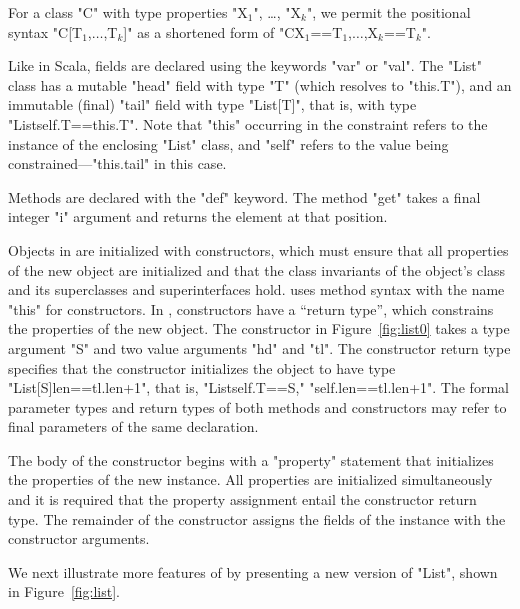 For a class
\xcd"C"
with type properties
\xcdmath"X$_1$",
\dots,
\xcdmath"X$_k$",
we permit the positional syntax
\xcdmath"C[T$_1$,$\dots$,T$_k$]"
as a shortened form of
\xcdmath"C{X$_1$==T$_1$,$\dots$,X$_k$==T$_k$}".

Like in Scala, fields are declared using the keywords \xcd"var"
or \xcd"val".  The \xcd"List" class has a mutable \xcd"head"
field with type \xcd"T" (which resolves to \xcd"this.T"), and an
immutable (final) \xcd"tail" field with type \xcd"List[T]", that
is, with type \xcd"List{self.T==this.T}".  Note that \xcd"this" occurring
in the constraint refers to the instance of the enclosing
\xcd"List" class,
and \xcd"self" refers to the value being
constrained---\xcd"this.tail" in this case.

Methods are declared with the \xcd"def" keyword.
The method \xcd"get" takes a final integer \xcd"i" argument
and returns the element at that position.

Objects in \Xten{} are initialized with constructors, which
must ensure that all properties of the new object
are initialized and that the class invariants of the object's
class and its superclasses and superinterfaces hold.
\Xten{} uses method syntax with the name
\xcd"this" for constructors.
In \Xten{}, constructors have a ``return type'', which constrains
the properties of the new object.  The constructor in
Figure~\ref{fig:list0} takes a type argument \xcd"S"
and two value arguments \xcd"hd" and \xcd"tl".  The constructor
return type specifies that the constructor initializes the
object to have type \xcd"List[S]{len==tl.len+1}", that is,
\xcd"List{self.T==S," \xcd"self.len==tl.len+1}".
The formal parameter types and return types of both methods and
constructors may refer to final parameters of the same
declaration.

The body of the constructor
begins with a \xcd"property" statement that initializes the
properties of the new instance.  All properties are initialized
simultaneously and it is required that the property assignment
entail the constructor return type.
The remainder of the constructor assigns the fields of the
instance with the constructor arguments.

We next illustrate more features of \Xten by
presenting a new version of \xcd"List", shown
in Figure~\ref{fig:list}.

